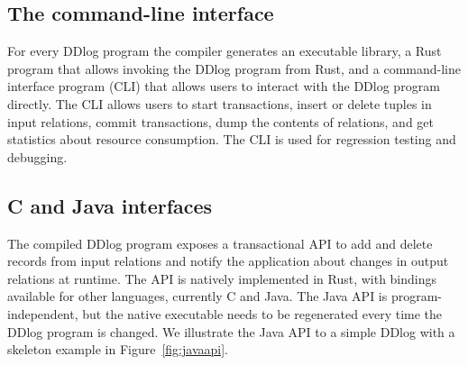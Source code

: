 \subsection{The command-line interface}

For every DDlog program the compiler generates an executable library,
a Rust program that allows invoking the DDlog program from Rust, and a
command-line interface program (CLI) that allows users to interact
with the DDlog program directly.  The CLI allows users to start
transactions, insert or delete tuples in input relations, commit
transactions, dump the contents of relations, and get statistics
about resource consumption.  The CLI is used for regression testing
and debugging.

\subsection{C and Java interfaces}

The compiled DDlog program exposes a transactional API to add and
delete records from input relations and notify the application about
changes in output relations at runtime.  The API is natively
implemented in Rust, with bindings available for other languages,
currently C and Java.  The Java API is program-independent, but the
native executable needs to be regenerated every time the DDlog program
is changed.  We illustrate the Java API to a simple DDlog with a
skeleton example in Figure~\ref{fig:javaapi}.

